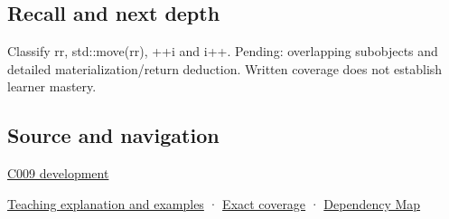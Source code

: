 \subsection{Recall and next depth}\label{appendix-1121b30eaeb0-recall-and-next-depth}

Classify rr, std::move(rr), ++i and i++. Pending: overlapping subobjects and detailed materialization/return deduction. Written coverage does not establish learner mastery.

\subsection{Source and navigation}\label{appendix-1121b30eaeb0-source-and-navigation}

\hyperref[appendix-fd090d982a15-m009---parts-127-147]{C009 development}

\hyperref[01-foundations-i-ch003-an-expression-has-a-type-and-a-category]{Teaching explanation and examples} · \hyperref[appendix-fd090d982a15-m008---parts-113-126]{Exact coverage} · \hyperref[appendix-4ad47bdd269a]{Dependency Map}

